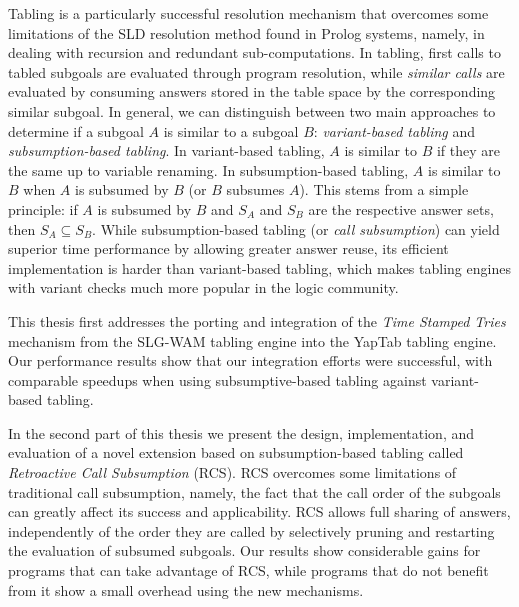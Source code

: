 Tabling is a particularly successful resolution mechanism that overcomes some limitations
of the SLD resolution method found in Prolog systems, namely, in dealing with recursion and redundant
sub-computations. In tabling, first calls to tabled subgoals are evaluated through
program resolution, while \emph{similar calls} are evaluated by consuming answers stored
in the table space by the corresponding similar subgoal.
In general, we can distinguish between two main approaches to determine if a subgoal $A$ is
similar to a subgoal $B$: \emph{variant-based tabling} and \emph{subsumption-based tabling}.
In variant-based tabling, $A$ is similar to $B$ if they are the same
up to variable renaming. In subsumption-based tabling, $A$ is similar to $B$ when $A$ is subsumed
by $B$ (or $B$ subsumes $A$). This stems from a simple principle: if $A$ is subsumed by $B$ and
$S_A$ and $S_B$ are the respective answer sets, then $S_A \subseteq S_B$.
While subsumption-based tabling (or \emph{call subsumption}) can yield superior time performance
by allowing greater answer reuse, its efficient implementation is harder than variant-based tabling,
which makes tabling engines with variant checks much more popular in the logic community.

This thesis first addresses the porting and integration of the \emph{Time Stamped Tries} mechanism
from the SLG-WAM tabling engine into the YapTab tabling engine. Our performance results show that our
integration efforts were successful, with comparable speedups when using subsumptive-based tabling against
variant-based tabling.

In the second part of this thesis we present the design, implementation, and evaluation of a novel extension
based on subsumption-based tabling called \emph{Retroactive Call Subsumption} (RCS). RCS overcomes some limitations
of traditional call subsumption, namely, the fact that the call order of the subgoals can greatly affect its
success and applicability. RCS allows full sharing of answers,
independently of the order they are called by selectively pruning and restarting the evaluation of subsumed
subgoals. Our results show considerable gains for programs that can take advantage of RCS, while programs
that do not benefit from it show a small overhead using the new mechanisms.
